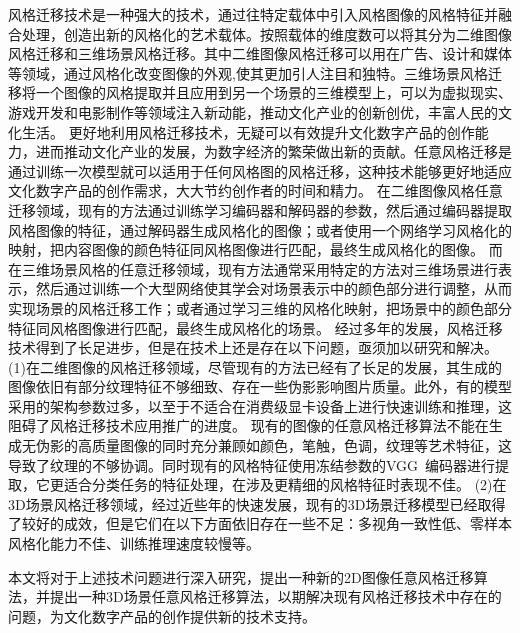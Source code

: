 \par 风格迁移技术是一种强大的技术，通过往特定载体中引入风格图像的风格特征并融合处理，创造出新的风格化的艺术载体。按照载体的维度数可以将其分为二维图像风格迁移和三维场景风格迁移。其中二维图像风格迁移可以用在广告、设计和媒体等领域，通过风格化改变图像的外观,使其更加引人注目和独特。三维场景风格迁移将一个图像的风格提取并且应用到另一个场景的三维模型上，可以为虚拟现实、游戏开发和电影制作等领域注入新动能，推动文化产业的创新创优，丰富人民的文化生活。
更好地利用风格迁移技术，无疑可以有效提升文化数字产品的创作能力，进而推动文化产业的发展，为数字经济的繁荣做出新的贡献。任意风格迁移是通过训练一次模型就可以适用于任何风格图的风格迁移，这种技术能够更好地适应文化数字产品的创作需求，大大节约创作者的时间和精力。
在二维图像风格任意迁移领域，现有的方法通过训练学习编码器和解码器的参数，然后通过编码器提取风格图像的特征，通过解码器生成风格化的图像；或者使用一个网络学习风格化的映射，把内容图像的颜色特征同风格图像进行匹配，最终生成风格化的图像。
而在三维场景风格的任意迁移领域，现有方法通常采用特定的方法对三维场景进行表示，然后通过训练一个大型网络使其学会对场景表示中的颜色部分进行调整，从而实现场景的风格迁移工作；或者通过学习三维的风格化映射，把场景中的颜色部分特征同风格图像进行匹配，最终生成风格化的场景。
\newline \indent
经过多年的发展，风格迁移技术得到了长足进步，但是在技术上还是存在以下问题，亟须加以研究和解决。~\cite{jing2019neural}
\newline \indent
(1)在二维图像的风格迁移领域，尽管现有的方法已经有了长足的发展，其生成的图像依旧有部分纹理特征不够细致、存在一些伪影影响图片质量。此外，有的模型采用的架构参数过多，以至于不适合在消费级显卡设备上进行快速训练和推理，这阻碍了风格迁移技术应用推广的进度。
现有的图像的任意风格迁移算法不能在生成无伪影的高质量图像的同时充分兼顾如颜色，笔触，色调，纹理等艺术特征，这导致了纹理的不够协调。同时现有的风格特征使用冻结参数的VGG~\cite{simonyan2015very}编码器进行提取，它更适合分类任务的特征处理，在涉及更精细的风格特征时表现不佳。
\newline \indent
(2)在3D场景风格迁移领域，经过近些年的快速发展，现有的3D场景迁移模型已经取得了较好的成效，但是它们在以下方面依旧存在一些不足：多视角一致性低、零样本风格化能力不佳、训练推理速度较慢等。
\par 本文将对于上述技术问题进行深入研究，提出一种新的2D图像任意风格迁移算法，并提出一种3D场景任意风格迁移算法，以期解决现有风格迁移技术中存在的问题，为文化数字产品的创作提供新的技术支持。




